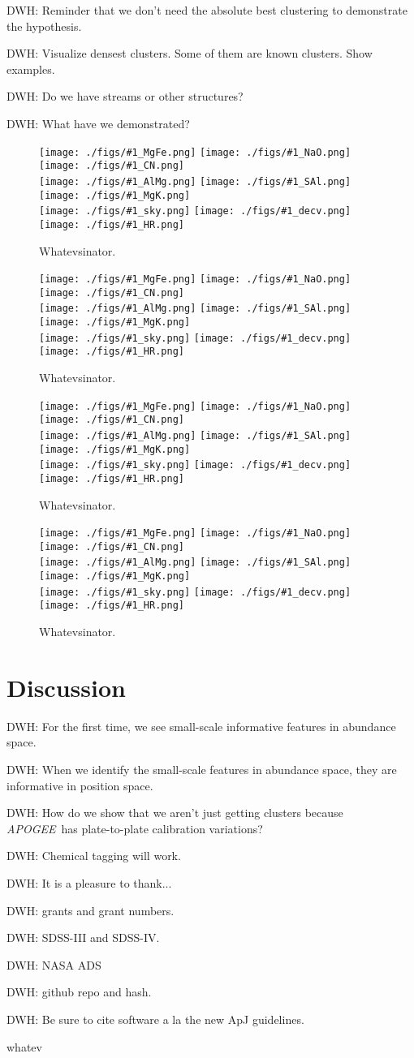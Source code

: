\documentclass[12pt, letterpaper, preprint]{aastex}
\newcommand{\acronym}[1]{{\small{#1}}}
\newcommand{\project}[1]{\textsl{#1}}
\newcommand{\apogee}{\project{\acronym{APOGEE}}}
\newcommand{\foreign}[1]{\textsl{#1}}
\newcommand{\etal}{\foreign{et\,al.}}
\newcommand{\insanefigure}[1]{%
\texttt{[image: ./figs/\#1\_MgFe.png]}%
\texttt{[image: ./figs/\#1\_NaO.png]}%
\texttt{[image: ./figs/\#1\_CN.png]}\\
\texttt{[image: ./figs/\#1\_AlMg.png]}%
\texttt{[image: ./figs/\#1\_SAl.png]}%
\texttt{[image: ./figs/\#1\_MgK.png]}\\
\texttt{[image: ./figs/\#1\_sky.png]}%
\texttt{[image: ./figs/\#1\_decv.png]}%
\texttt{[image: ./figs/\#1\_HR.png]}}
\begin{document}
DWH: Reminder that we don't need the absolute best clustering to
demonstrate the hypothesis.

DWH: Visualize densest clusters.  Some of them are known clusters.
Show examples.

DWH: Do we have streams or other structures?

DWH: What have we demonstrated?

\begin{figure}[!p]
\insanefigure{cluster_0256_0253}
\caption{Whatevsinator.\label{fig:halocluster}}
\end{figure}

\begin{figure}[!p]
\insanefigure{cluster_0256_0034}
\caption{Whatevsinator.\label{fig:diskcluster}}
\end{figure}

\begin{figure}[!p]
\insanefigure{cluster_0128_0007}
\caption{Whatevsinator.\label{fig:halo}}
\end{figure}

\begin{figure}[!p]
\insanefigure{cluster_0256_0141}
\caption{Whatevsinator.\label{fig:disk}}
\end{figure}

\clearpage
\section{Discussion}

DWH: For the first time, we see small-scale informative features in abundance space.

DWH: When we identify the small-scale features in abundance space, they are informative in position space.

DWH: How do we show that we aren't just getting clusters because \apogee\ has plate-to-plate calibration variations?

DWH: Chemical tagging will work.

\acknowledgements
DWH: It is a pleasure to thank...

DWH: grants and grant numbers.

DWH: SDSS-III and SDSS-IV.

DWH: NASA ADS

DWH: github repo and hash.

DWH: Be sure to cite software a la the new ApJ guidelines.

\clearpage
\begin{thebibliography}{24}\raggedright
\bibitem[Ness \etal(2016)]{ness16}
whatev
\end{thebibliography}
\end{document}
